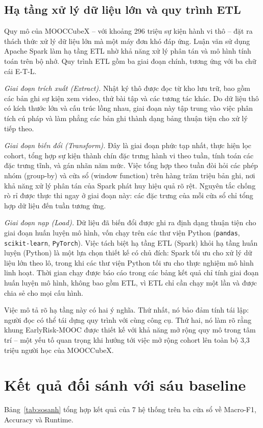 \subsection{Hạ tầng xử lý dữ liệu lớn và quy trình ETL}

Quy mô của MOOCCubeX -- với khoảng 296 triệu sự kiện hành vi thô -- đặt ra thách thức xử lý dữ liệu lớn mà một máy đơn khó đáp ứng. Luận văn sử dụng Apache Spark \cite{Zaharia2016} làm hạ tầng ETL nhờ khả năng xử lý phân tán và mô hình tính toán trên bộ nhớ. Quy trình ETL gồm ba giai đoạn chính, tương ứng với ba chữ cái E-T-L.

\textit{Giai đoạn trích xuất (Extract).} Nhật ký thô được đọc từ kho lưu trữ, bao gồm các bản ghi sự kiện xem video, thử bài tập và các tương tác khác. Do dữ liệu thô có kích thước lớn và cấu trúc lồng nhau, giai đoạn này tập trung vào việc phân tích cú pháp và làm phẳng các bản ghi thành dạng bảng thuận tiện cho xử lý tiếp theo.

\textit{Giai đoạn biến đổi (Transform).} Đây là giai đoạn phức tạp nhất, thực hiện lọc cohort, tổng hợp sự kiện thành chín đặc trưng hành vi theo tuần, tính toán các đặc trưng tĩnh, và gán nhãn năm mức. Việc tổng hợp theo tuần đòi hỏi các phép nhóm (group-by) và cửa sổ (window function) trên hàng trăm triệu bản ghi, nơi khả năng xử lý phân tán của Spark phát huy hiệu quả rõ rệt. Nguyên tắc chống rò rỉ được thực thi ngay ở giai đoạn này: các đặc trưng của mỗi cửa sổ chỉ tổng hợp dữ liệu đến tuần tương ứng.

\textit{Giai đoạn nạp (Load).} Dữ liệu đã biến đổi được ghi ra định dạng thuận tiện cho giai đoạn huấn luyện mô hình, vốn chạy trên các thư viện Python (\texttt{pandas}, \texttt{scikit-learn}, \texttt{PyTorch}). Việc tách biệt hạ tầng ETL (Spark) khỏi hạ tầng huấn luyện (Python) là một lựa chọn thiết kế có chủ đích: Spark tối ưu cho xử lý dữ liệu lớn theo lô, trong khi các thư viện Python tối ưu cho thực nghiệm mô hình linh hoạt. Thời gian chạy được báo cáo trong các bảng kết quả chỉ tính giai đoạn huấn luyện mô hình, không bao gồm ETL, vì ETL chỉ cần chạy một lần và được chia sẻ cho mọi cấu hình.

Việc mô tả rõ hạ tầng này có hai ý nghĩa. Thứ nhất, nó bảo đảm tính tái lập: người đọc có thể tái dựng quy trình với cùng công cụ. Thứ hai, nó làm rõ rằng khung EarlyRisk-MOOC được thiết kế với khả năng mở rộng quy mô trong tâm trí -- một yếu tố quan trọng khi hướng tới việc mở rộng cohort lên toàn bộ 3,3 triệu người học của MOOCCubeX.

\section{Kết quả đối sánh với sáu baseline}
\label{sec:doisanh}
Bảng~\ref{tab:sosanh} tổng hợp kết quả của 7 hệ thống trên ba cửa sổ về Macro-F1, Accuracy và Runtime.

